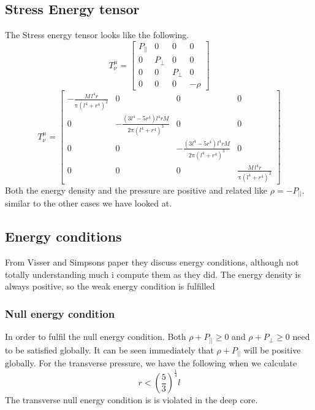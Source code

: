 \documentclass[a4paper,11pt]{article}
\begin{document}
\subsection{Stress Energy tensor}
The Stress energy tensor looks like the following. 
\begin{equation}
T^{\mu}_{\nu}=
\begin{bmatrix}
P_{||} & 0 & 0 & 0 
\\
 0 & P_{\bot} & 0 & 0 
\\
 0 & 0 & P_{\bot} & 0 
\\
 0 & 0 & 0 & - \rho 
\end{bmatrix}
\end{equation}
\begin{equation}
T^{\mu}_{\nu}=
\begin{bmatrix}
-\frac{M \,l^{4} r}{\mathrm{\pi} \left(l^{4}+r^{4}\right)^{2}} & 0 & 0 & 0
\\
 0 & -\frac{\left(3 l^{4}-5 r^{4}\right) l^{4} r M}{2 \mathrm{\pi} \left(l^{4}+r^{4}\right)^{3}} & 0 & 0 
\\
 0 & 0 & -\frac{\left(3 l^{4}-5 r^{4}\right) l^{4} r M}{2 \mathrm{\pi} \left(l^{4}+r^{4}\right)^{3}} & 0 
\\
 0 & 0 & 0 & \frac{M \,l^{4} r}{\mathrm{\pi} \left(l^{4}+r^{4}\right)^{2}} 
 \end{bmatrix}{}
\end{equation}
 Both the energy density and the pressure are positive and related like $ \rho = -P_{||} $. similar to the other cases we have looked at.
\subsection{Energy conditions}
From Visser and Simpsons paper they discuss energy conditions, although not totally understanding much i compute them as they did. The energy density is always positive, so the weak energy condition is fulfilled
\subsubsection{Null energy condition}
In order to fulfil the null energy condition. Both $\rho + P_{||} \geq 0$ and $\rho + P_{\bot} \geq 0$ need to be satisfied globally. It can be seen immediately that $\rho + P_{||}$ will be positive globally. For the transverse pressure, we have the following when we calculate
\begin{equation}
r<(\frac{5}{3})^{\frac{1}{4}}l
\end{equation}
The transverse null energy condition is is violated in the deep core.
\end{document}
